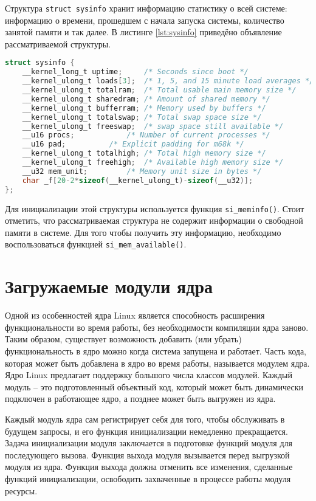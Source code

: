 Структура \texttt{struct sysinfo} \cite{sysinfo} хранит информацию статистику о всей системе: информацию о времени, прошедшем с начала запуска системы, количество занятой памяти и так далее. В листинге \ref{lst:sysinfo} приведёно объявление рассматриваемой структуры.\\

\begin{lstlisting}[label=lst:sysinfo, caption=Листинг структуры \texttt{struct sysinfo}, language=c]
struct sysinfo {
	__kernel_long_t uptime;		/* Seconds since boot */
	__kernel_ulong_t loads[3];	/* 1, 5, and 15 minute load averages */
	__kernel_ulong_t totalram;	/* Total usable main memory size */
	__kernel_ulong_t sharedram;	/* Amount of shared memory */
	__kernel_ulong_t bufferram;	/* Memory used by buffers */
	__kernel_ulong_t totalswap;	/* Total swap space size */
	__kernel_ulong_t freeswap;	/* swap space still available */
	__u16 procs;		   	/* Number of current processes */
	__u16 pad;		   	/* Explicit padding for m68k */
	__kernel_ulong_t totalhigh;	/* Total high memory size */
	__kernel_ulong_t freehigh;	/* Available high memory size */
	__u32 mem_unit;			/* Memory unit size in bytes */
	char _f[20-2*sizeof(__kernel_ulong_t)-sizeof(__u32)];
};
\end{lstlisting}

Для инициализации этой структуры используется функция \texttt{si\_meminfo()}. Стоит отметить, что рассматриваемая структура не содержит информации о свободной памяти в системе. Для того чтобы получить эту информацию, необходимо воспользоваться функцией \texttt{si\_mem\_available()}.

\section{Загружаемые модули ядра}

Одной из особенностей ядра Linux является способность расширения функциональности во время работы, без необходимости компиляции ядра заново. Таким образом, существует возможность добавить (или убрать) функциональность в ядро можно когда система запущена и работает. Часть кода, которая может быть добавлена в ядро во время работы, называется модулем ядра. Ядро Linux предлагает поддержку большого числа классов модулей. Каждый модуль -- это подготовленный объектный код, который может быть динамически подключен в работающее ядро, а позднее может быть выгружен из ядра.

Каждый модуль ядра сам регистрирует себя для того, чтобы обслуживать в будущем запросы, и его функция инициализации немедленно прекращается. Задача инициализации модуля заключается в подготовке функций модуля для последующего вызова. Функция выхода модуля вызывается перед выгрузкой модуля из ядра. Функция выхода должна отменить все изменения, сделанные функций инициализации, освободить захваченные в процессе работы модуля ресурсы. 

